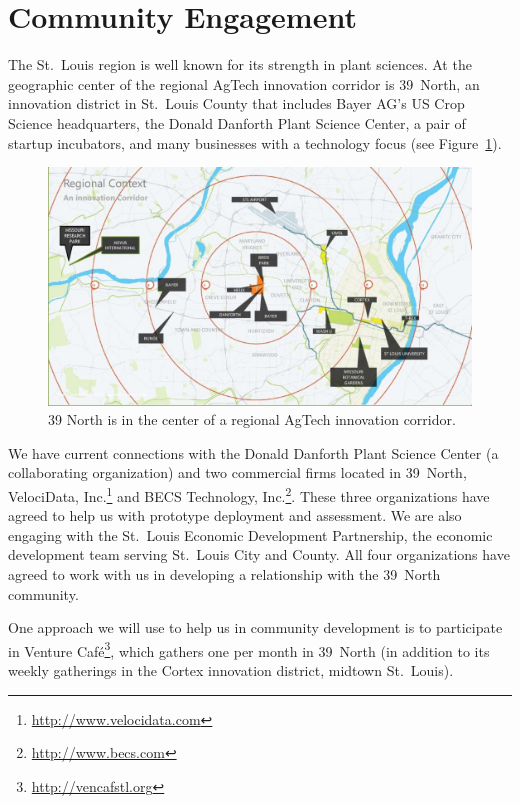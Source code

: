 \section{Community Engagement}
\label{sec:community}

The St.~Louis region is well known for its strength in plant sciences.
At the geographic center of the regional AgTech innovation corridor is
39~North, an innovation district in St.~Louis County that includes Bayer AG's
US Crop Science headquarters, the Donald Danforth Plant Science Center,
a pair of startup incubators, and many businesses with a technology focus
(see Figure~\ref{fig:39N}).

\begin{figure}[ht]
\centering
\includegraphics[width=0.75\linewidth]{figures/39N}
\caption{39 North is in the center of a regional AgTech innovation corridor.}
\label{fig:39N}
\end{figure}

We have current connections with the Donald Danforth Plant Science
Center (a collaborating organization) and two commercial firms
located in 39~North,
VelociData, Inc.\footnote{\url{http://www.velocidata.com}} and
BECS Technology, Inc.\footnote{\url{http://www.becs.com}}.
These three organizations have agreed to help us with prototype deployment
and assessment.
We are also engaging with the St.~Louis Economic Development Partnership,
the economic development team serving St.~Louis City and County.
All four organizations have agreed to work with us in
developing a relationship with the 39~North community.

One approach we will use to help us in community development is to participate
in Venture Caf\'e\footnote{\url{http://vencafstl.org}}, which gathers one per
month in 39~North (in addition to its weekly gatherings in the Cortex
innovation district, midtown St.~Louis).
